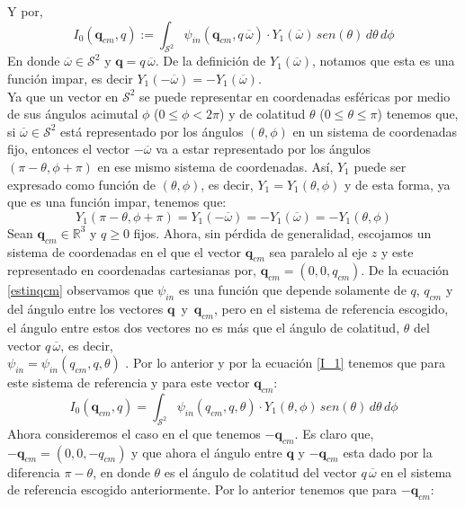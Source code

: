 \documentclass[12pt]{book}
\numberwithin{equation}{chapter}
\def\q{\mathbf{q}}
\def\n{\noindent}
\def\R{\mathbb{R}}
\def\S{\mathcal{S}}
\def\w{\overline{\omega}}
\def\t{\theta}
\begin{document}
Y por,
\begin{equation}\label{I_1}
I_{0}(\q_{cm},q) := \int_{\S^{2}} \psi_{in}(\q_{cm},q\, \w)\cdot Y_{1}(\w) \, sen(\t) \, d\t \, d\phi
\end{equation}
En donde $\w \in \S^{2}$ y $\q= q\, \w$. De la definici\'on de $Y_{1}(\w)$, notamos que esta es una funci\'on impar, es decir $Y_{1}(-\w)=-Y_{1}(\w)$.\\
\n Ya que un vector en $\S^{2}$ se puede representar en coordenadas esf\'ericas por medio de sus \'angulos acimutal $\phi$ ($0\leq \phi < 2\pi$) y de colatitud $\t$ ($0\leq \t \leq \pi$) tenemos que, si $\w \in \S^{2}$ est\'a representado por los \'angulos $(\t , \phi)$ en un sistema de coordenadas fijo, entonces el vector $-\w$ va a estar representado por los \'angulos $ (\pi - \t , \phi + \pi) $ en ese mismo sistema de coordenadas. As\'i, $Y_{1}$ puede ser expresado como funci\'on de $(\t,\phi)$, es decir, $ Y_{1}= Y_{1}(\theta, \phi) $ y de esta forma, ya que es una funci\'on impar, tenemos que:
\begin{equation}\label{y1im}
Y_{1}(\pi - \t , \phi + \pi)= Y_{1}(-\w)= -Y_{1}(\w)= -Y_{1}(\t , \phi)
\end{equation}
Sean $\q_{cm} \in \R^{3}$ y $q \geq 0$ fijos. Ahora, sin p\'erdida de generalidad, escojamos un sistema de coordenadas en el que el vector $\q_{cm}$ sea paralelo al eje $z$ y este representado en coordenadas cartesianas por, $\q_{cm}=(0,0,q_{cm})$. De la ecuaci\'on \eqref{estinqcm} observamos que $\psi_{in}$ es una funci\'on que depende solamente de $q$, $q_{cm}$ y del \'angulo entre los vectores $\q\, $ y $\, \q_{cm}$, pero en el sistema de referencia escogido, el \'angulo entre estos dos vectores no es m\'as que el \'angulo de colatitud, $\t$ del vector $q\, \w$, es decir,\\
$\psi_{in}=\psi_{in}(q_{cm},q,\t) $ . Por lo anterior y por la ecuaci\'on \eqref{I_1} tenemos que para este sistema de referencia y para este vector $\q_{cm}$:
\begin{equation}\label{I_2}
I_{0}(\q_{cm},q) = \int_{\S^{2}} \psi_{in}(q_{cm},q,\t)\cdot Y_{1}(\t,\phi) \, sen(\t) \, d\t \, d\phi
\end{equation}
Ahora consideremos el caso en el que tenemos $-\q_{cm}$. Es claro que, $-\q_{cm}=(0,0,-q_{cm})$ y que ahora el \'angulo entre $\q$ y $-\q_{cm}$ esta dado por la diferencia $\pi - \t$, en donde $\t$ es el \'angulo de colatitud del vector $q\, \w$ en el sistema de referencia escogido anteriormente. Por lo anterior tenemos que para $-\q_{cm}$:
\end{document}
